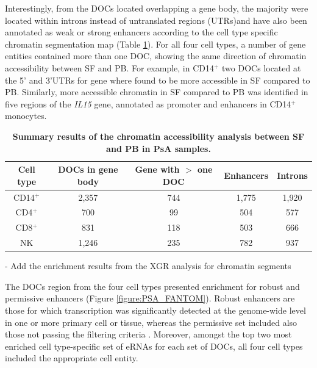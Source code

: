 Interestingly, from the DOCs located overlapping a gene body, the majority were located within introns instead of untranslated regions (UTRs)and have also been annotated as weak or strong enhancers according to the cell type specific chromatin segmentation map (Table \ref{tab:PSA_DOCs_results}). For all four cell types, a number of gene entities contained more than one DOC, showing the same direction of chromatin accessibility between SF and PB. For example, in CD14$^+$ two DOCs located at the 5' and 3'UTRs for  gene where found to be more accessible in SF compared to PB. Similarly, more accessible chromatin in SF compared to PB was identified in five regions of the \textit{IL15} gene, annotated as promoter and enhancers in CD14$^+$ monocytes. 

\begin{table}[htbp]
\centering
\begin{tabular}{@{} c c c c c}
\toprule
\textbf{Cell type} & \textbf{DOCs in gene body} &  \textbf{Gene with $>$ one DOC} &\textbf{Enhancers} & \textbf{Introns} \\
\midrule
\midrule
CD14$^+$ & 2,357 & 744 & 1,775 & 1,920 \\
CD4$^+$ & 700 & 99 & 504 & 577 \\
CD8$^+$ & 831 & 118 & 503 & 666 \\
NK   & 1,246 & 235 & 782 & 937 \\   
\bottomrule
\end{tabular}
\medskip %
\caption[Summary results of the chromatin accessibility analysis between SF and PB in PsA samples.]{\textbf{Summary results of the chromatin accessibility analysis between SF and PB in PsA samples.}}
\label{tab:PSA_DOCs_results}
\end{table}


- Add the enrichment results from the XGR analysis for chromatin segments

The DOCs region from the four cell types presented enrichment for robust and permissive enhancers (Figure \ref{figure:PSA_FANTOM}). Robust enhancers are those for which transcription was significantly detected at the genome-wide level in one or more primary cell or tissue, whereas the permissive set included also those not passing the filtering criteria \parencite{Andersson2014}. Moreover, amongst the top two most enriched cell type-specific set of eRNAs for each set of DOCs, all four cell types included the appropriate cell entity.


